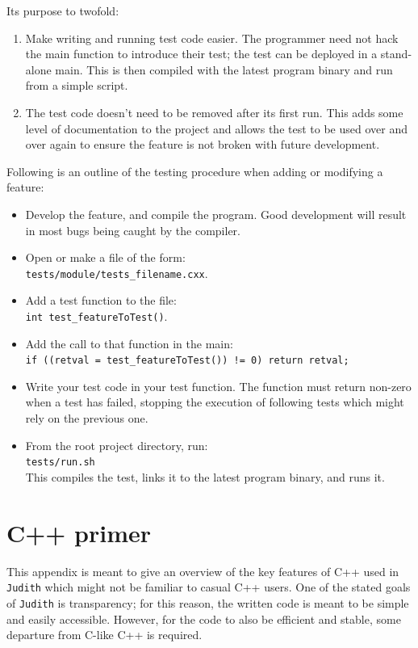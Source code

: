 \documentclass[10pt,a4paper]{book}
\newcommand{\Judith}{\Verb`Judith` }
\begin{document}
Its purpose to twofold:

\begin{enumerate}
	\item Make writing and running test code easier. The programmer need not hack the main function to introduce their test; the test can be deployed in a stand-alone main. This is then compiled with the latest program binary and run from a simple script.
	\item The test code doesn't need to be removed after its first run. This adds some level of documentation to the project and allows the test to be used over and over again to ensure the feature is not broken with future development.
\end{enumerate}

Following is an outline of the testing procedure when adding or modifying a feature:

\begin{itemize}
	\item Develop the feature, and compile the program. Good development will result in most bugs being caught by the compiler.
	\item Open or make a file of the form: \\
	      \Verb`tests/module/tests_filename.cxx`.
	\item Add a test function to the file:\\
		  \Verb`int test_featureToTest()`.
	\item Add the call to that function in the main:\\
		  \Verb`if ((retval = test_featureToTest()) != 0) return retval;`
	\item Write your test code in your test function. The function must return non-zero when a test has failed, stopping the execution of following tests which might rely on the previous one.
	\item From the root project directory, run:\\
		  \Verb`tests/run.sh` \\
		  This compiles the test, links it to the latest program binary, and runs it.
\end{itemize}

\appendix

\chapter{C++ primer}
\label{ch:cppprimer}

This appendix is meant to give an overview of the key features of C++ used in \Judith which might not be familiar to casual C++ users. One of the stated goals of \Judith is transparency; for this reason, the written code is meant to be simple and easily accessible. However, for the code to also be efficient and stable, some departure from C-like C++ is required.
\end{document}
